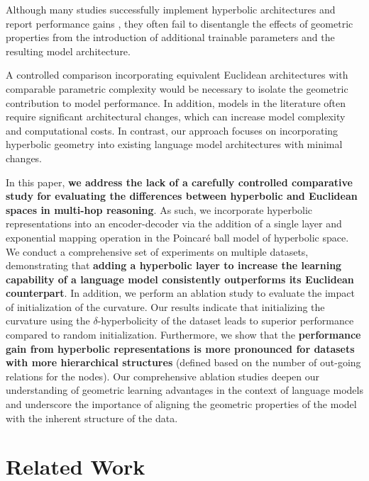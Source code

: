 \documentclass[11pt]{article}
\begin{document}
Although many studies successfully implement hyperbolic architectures and report performance gains \cite{zhou2021multi, xiao2022hyperbolic, wang2024hypermr}, they often fail to disentangle the effects of geometric properties from the introduction of additional trainable parameters and the resulting model architecture. 
 
A controlled comparison incorporating equivalent Euclidean architectures with comparable parametric complexity would be necessary to isolate the geometric contribution to model performance. In addition, models in the literature often require significant architectural changes, which can increase model complexity and computational costs. In contrast, our approach focuses on incorporating hyperbolic geometry into existing language model architectures with minimal changes.

In this paper, \textbf{we address the lack of a carefully controlled comparative study for evaluating the differences between hyperbolic and Euclidean spaces in multi-hop reasoning}. As such, we incorporate hyperbolic representations into an encoder-decoder via the addition of a single layer and exponential mapping operation in the Poincaré ball model of hyperbolic space. We conduct a comprehensive set of experiments on multiple datasets, demonstrating that \textbf{adding a hyperbolic layer to increase the learning capability of a language model consistently outperforms its Euclidean counterpart}. In addition, we perform an ablation study to evaluate the impact of initialization of the curvature. Our results indicate that initializing the curvature using the $\delta$-hyperbolicity of the dataset leads to superior performance compared to random initialization. Furthermore, we show that the \textbf{performance gain from hyperbolic representations is more pronounced for datasets with more hierarchical structures} (defined based on the number of out-going relations for the nodes). Our comprehensive ablation studies deepen our understanding of geometric learning advantages in the context of language models and underscore the importance of aligning the geometric properties of the model with the inherent structure of the data.

\section{Related Work}
\end{document}
